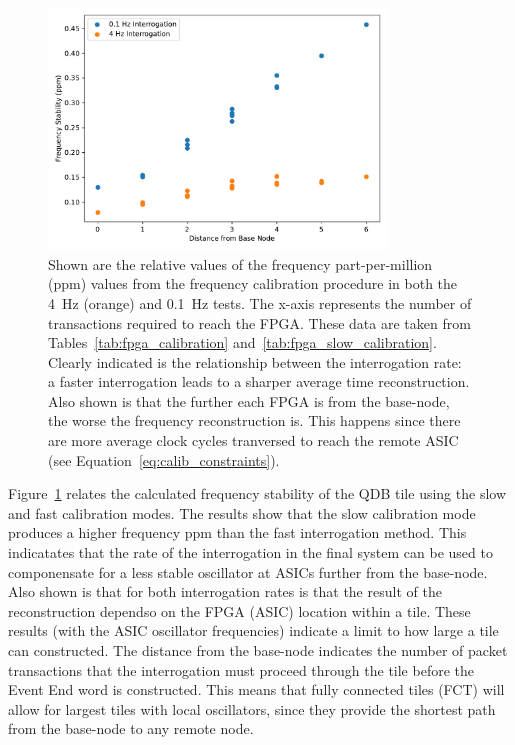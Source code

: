 \begin{figure}[]
\centering
\includegraphics[width=0.8\textwidth]{images/interrogation_ppm_diff.pdf}
\caption{Shown are the relative values of the frequency part-per-million (ppm) values from the frequency calibration procedure in both the 4~\unit{Hz} (orange) and 0.1~\unit{Hz} tests.
The x-axis represents the number of transactions required to reach the FPGA.
These data are taken from Tables~\ref{tab:fpga_calibration} and~\ref{tab:fpga_slow_calibration}.
Clearly indicated is the relationship between the interrogation rate: a faster interrogation leads to a sharper average time reconstruction.
Also shown is that the further each FPGA is from the base-node, the worse the frequency reconstruction is.
This happens since there are more average clock cycles tranversed to reach the remote ASIC (see Equation~\ref{eq:calib_constraints}).
}
\label{fig:calibration_position}
\end{figure}

Figure~\ref{fig:calibration_position} relates the calculated frequency stability of the QDB tile using the slow and fast calibration modes.
The results show that the slow calibration mode produces a higher frequency ppm than the fast interrogation method. 
This indicatates that the rate of the interrogation in the final system can be used to componensate for a less stable oscillator at ASICs further from the base-node.
Also shown is that for both interrogation rates is that the result of the reconstruction dependso on the FPGA (ASIC) location within a tile.
These results (with the ASIC oscillator frequencies) indicate a limit to how large a tile can constructed.
The distance from the base-node indicates the number of packet transactions that the interrogation must proceed through the tile before the Event End word is constructed.
This means that fully connected tiles (FCT) will allow for largest tiles with local oscillators, since they provide the shortest path from the base-node to any remote node.

